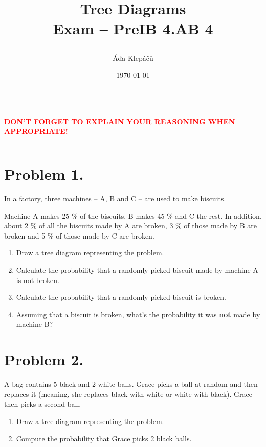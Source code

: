 \documentclass[a4paper,11pt]{article}
\title{\Huge\textsf{Tree Diagrams}\\
 \Large\textsf{Exam -- PreIB 4.AB 4}
 \author{Áďa Klepáčů}
 \date{\today}
}
\newcommand{\clr}{\textcolor{red}}
\begin{document}
\maketitle
\thispagestyle{empty}

\begin{center}
 \hrule
 \textbf{\clr{\uppercase{Don't forget to explain your reasoning when
 appropriate!}}}
 \vspace{2ex}
 \hrule
\end{center}

\section*{Problem 1.}

In a factory, three machines -- A, B and C -- are used to make biscuits.

Machine A makes 25 \% of the biscuits, B makes 45 \% and C the rest. In
addition, about 2 \% of all the biscuits made by A are broken, 3 \% of those
made by B are broken and 5 \% of those made by C are broken.

\begin{enumerate}
 \item Draw a tree diagram representing the problem.
 \item Calculate the probability that a randomly picked biscuit made by machine
  A is not broken.
 \item Calculate the probability that a randomly picked biscuit is broken.
 \item Assuming that a biscuit is broken, what's the probability it was
  \textbf{not} made by machine B?
\end{enumerate}

\section*{Problem 2.}

A bag contains 5 black and 2 white balls. Grace picks a ball at random and then
replaces it (meaning, she replaces black with white or white with black). Grace
then picks a second ball.

\begin{enumerate}
 \item Draw a tree diagram representing the problem.
 \item Compute the probability that Grace picks 2 black balls.
\end{enumerate}
 
\end{document}
